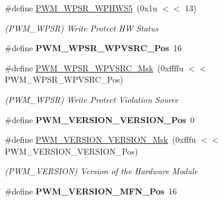 \begin{DoxyCompactItemize}
\mbox{\label{group__SAMV71__PWM_ga3b73f74236c8fefeb78205a385c9a895}} 
\#define \mbox{\hyperlink{group__SAMV71__PWM_ga3b73f74236c8fefeb78205a385c9a895}{P\+W\+M\+\_\+\+W\+P\+S\+R\+\_\+\+W\+P\+H\+W\+S5}}~(0x1u $<$$<$ 13)
\begin{DoxyCompactList}\small\item\em (P\+W\+M\+\_\+\+W\+P\+SR) Write Protect HW Status \end{DoxyCompactList}\item 
\mbox{\label{group__SAMV71__PWM_ga0094684a5f44b6b03640baa9fdc6135f}} 
\#define {\bfseries P\+W\+M\+\_\+\+W\+P\+S\+R\+\_\+\+W\+P\+V\+S\+R\+C\+\_\+\+Pos}~16
\item 
\mbox{\label{group__SAMV71__PWM_gac48a1ab59a4e311dbdd1abba533a1ef2}} 
\#define \mbox{\hyperlink{group__SAMV71__PWM_gac48a1ab59a4e311dbdd1abba533a1ef2}{P\+W\+M\+\_\+\+W\+P\+S\+R\+\_\+\+W\+P\+V\+S\+R\+C\+\_\+\+Msk}}~(0xffffu $<$$<$ P\+W\+M\+\_\+\+W\+P\+S\+R\+\_\+\+W\+P\+V\+S\+R\+C\+\_\+\+Pos)
\begin{DoxyCompactList}\small\item\em (P\+W\+M\+\_\+\+W\+P\+SR) Write Protect Violation Source \end{DoxyCompactList}\item 
\mbox{\label{group__SAMV71__PWM_gac88a96168a6298f242f3c78dcdb29bd9}} 
\#define {\bfseries P\+W\+M\+\_\+\+V\+E\+R\+S\+I\+O\+N\+\_\+\+V\+E\+R\+S\+I\+O\+N\+\_\+\+Pos}~0
\item 
\mbox{\label{group__SAMV71__PWM_gaeb467131264027263b117a0e574990ce}} 
\#define \mbox{\hyperlink{group__SAMV71__PWM_gaeb467131264027263b117a0e574990ce}{P\+W\+M\+\_\+\+V\+E\+R\+S\+I\+O\+N\+\_\+\+V\+E\+R\+S\+I\+O\+N\+\_\+\+Msk}}~(0xfffu $<$$<$ P\+W\+M\+\_\+\+V\+E\+R\+S\+I\+O\+N\+\_\+\+V\+E\+R\+S\+I\+O\+N\+\_\+\+Pos)
\begin{DoxyCompactList}\small\item\em (P\+W\+M\+\_\+\+V\+E\+R\+S\+I\+ON) Version of the Hardware Module \end{DoxyCompactList}\item 
\mbox{\label{group__SAMV71__PWM_ga4033040790f6a665c6084567f9ad3fa5}} 
\#define {\bfseries P\+W\+M\+\_\+\+V\+E\+R\+S\+I\+O\+N\+\_\+\+M\+F\+N\+\_\+\+Pos}~16
$$
\end{DoxyCompactItemize}
